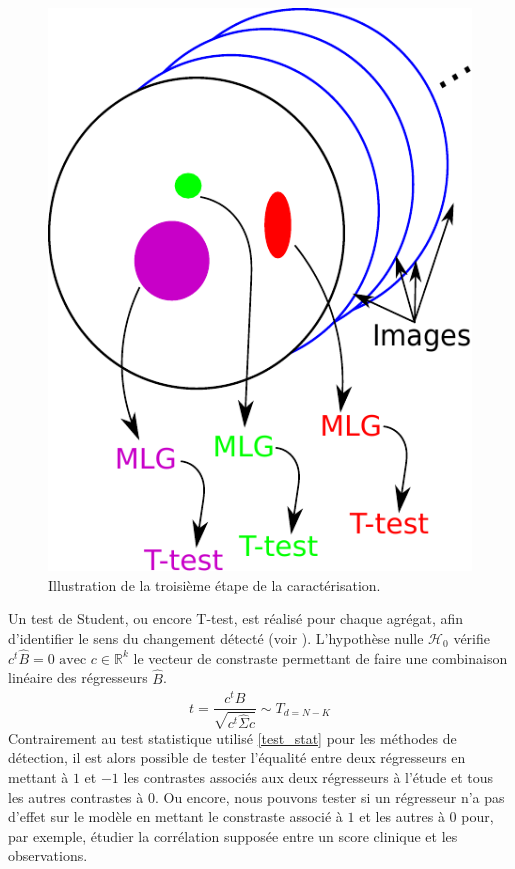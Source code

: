\begin{figure}[ht]
    \centering
    \includegraphics[scale=0.6]{Images/etape_carac_3.pdf}
    \caption{\label{etape_carac_3}Illustration de la troisième étape de la caractérisation.}
\end{figure}
Un test de Student, ou encore T-test, est réalisé pour chaque agrégat, afin d'identifier le sens du changement détecté (voir ).
L'hypothèse nulle $\mathcal{H}_0$ vérifie $c^t \hat{B} =0 \text{ avec } c \in \mathbb{R}^{k}$ 
le vecteur de constraste permettant de faire une combinaison linéaire des régresseurs $\hat{B}$.
\begin{equation}
    t = \frac{c^t\hat{B}}{\sqrt{c^t\hat{\Sigma}c}} \sim T_{d=N-K}
\end{equation}
Contrairement au test statistique utilisé \eqref{test_stat} pour les méthodes de détection,
il est alors possible de tester l'équalité entre deux régresseurs en mettant à $1$ et $-1$ les contrastes associés aux deux régresseurs à l'étude et tous les autres contrastes à $0$.
Ou encore, nous pouvons tester si un régresseur n'a pas d'effet sur le modèle en mettant le constraste associé à $1$ et les autres à $0$ pour, par exemple, étudier la corrélation supposée entre un score clinique et les observations.

